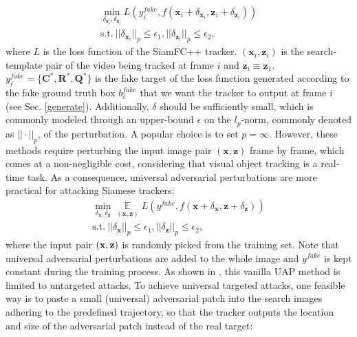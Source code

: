 \documentclass[journal]{IEEEtran}
\begin{document}
\begin{equation}
\begin{gathered}
  \min\limits_{\delta_{\textbf{x}_{i}}, \delta_{\textbf{z}_{i}}} L(y^{fake}_i, f(\textbf{x}_i + \delta_{\textbf{x}_{i}}, \textbf{z}_i + \delta_{\textbf{z}_{i}}))\\
  \text{s.t.}\ ||\delta_{\textbf{x}_i}||_p \le \epsilon_1, ||\delta_{\textbf{z}_i}||_p \le \epsilon_2,
\end{gathered}
\end{equation}
where $L$ is the loss function of the SiamFC++ tracker. $(\textbf{x}_i, \textbf{z}_i)$ is the search-template pair of the video being tracked at frame $i$ and $\textbf{z}_i \equiv \textbf{z}_1$. $y^{fake}_i=\{\textbf{C}^*, \textbf{R}^*, \textbf{Q}^*\}$ is the fake target of the loss function generated according to the fake ground truth box $b^{fake}_i$ that we want the tracker to output at frame $i$ (see Sec. \ref{generate}). 
Additionally, $\delta$ should be sufficiently small, which is commonly modeled through an upper-bound $\epsilon$ on the $l_p\text{-norm}$, commonly denoted as $||\cdot||_p$, of the perturbation. A popular choice is to set $p=\infty$.
However, these methods require perturbing the input image pair $(\textbf{x}, \textbf{z})$ frame by frame, which comes at a non-negligible cost, considering that visual object tracking is a real-time task.
As a consequence, universal adversarial perturbations \cite{UAP, shafahi2020universal} are more practical for attacking Siamese trackers:
\begin{equation}
  \begin{gathered}
    \min\limits_{\delta_\textbf{x}, \delta_\textbf{z}} \mathop{\mathbb{E}}\limits_{(\textbf{x}, \textbf{z})} L(y^{fake}, f(\textbf{x} + \delta_\textbf{x}, \textbf{z} + \delta_\textbf{z}))\\
    \text{s.t.}\ ||\delta_\textbf{x}||_p \le \epsilon_1, ||\delta_\textbf{z}||_p \le \epsilon_2,
  \end{gathered}
\end{equation}  
where the input pair $(\textbf x,\textbf z)$ is randomly picked from the training set. 
Note that universal adversarial perturbations are added to the whole image and $y^{fake}$ is kept constant during the training process.
As shown in \cite{hirano2020simple}, this vanilla UAP method is limited to untargeted attacks.
To achieve universal targeted attacks, one feasible way is to paste a small (universal) adversarial patch into the search images adhering to the predefined trajectory, so that the tracker outputs the location and size of the adversarial patch instead of the real target:
\end{document}
